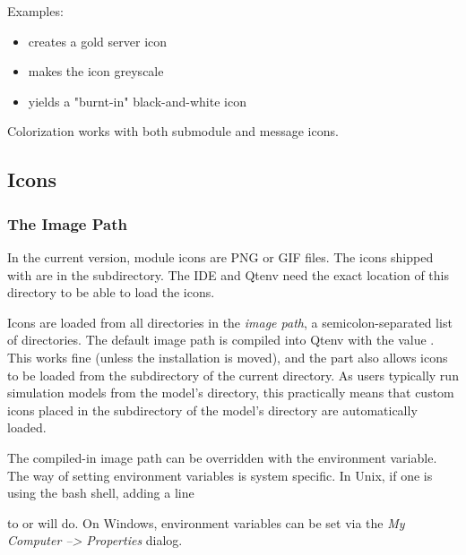 Examples:

\begin{itemize}
  \item {} creates a gold server icon
  \item {} makes the icon greyscale
  \item {} yields a "burnt-in" black-and-white icon
\end{itemize}

Colorization works with both submodule and message icons.


\subsection{Icons}
\label{sec:graphics:icon-library}

\subsubsection{The Image Path}
\label{sec:graphics:image-path}

In the current {\opp} version, module icons are PNG or GIF files. The icons shipped
with {\opp} are in the  subdirectory. The IDE and Qtenv
need the exact location of this directory to be able to load the icons.

Icons are loaded from all directories in the \textit{image path},
a semicolon-separated list of directories.
The default image path is compiled into Qtenv with the value
. This works fine (unless the
{\opp} installation is moved), and the  part also allows
icons to be loaded from the  subdirectory of the current
directory. As users typically run simulation models from the model's
directory, this practically means that custom icons placed in the
 subdirectory of the model's directory are automatically
loaded.

The compiled-in image path can be overridden with the 
environment variable. The way of setting environment variables is system
specific. In Unix, if one is using the bash shell, adding a line


to  or  will
do. On Windows, environment variables can be set via the \textit{My Computer -->
Properties} dialog.

